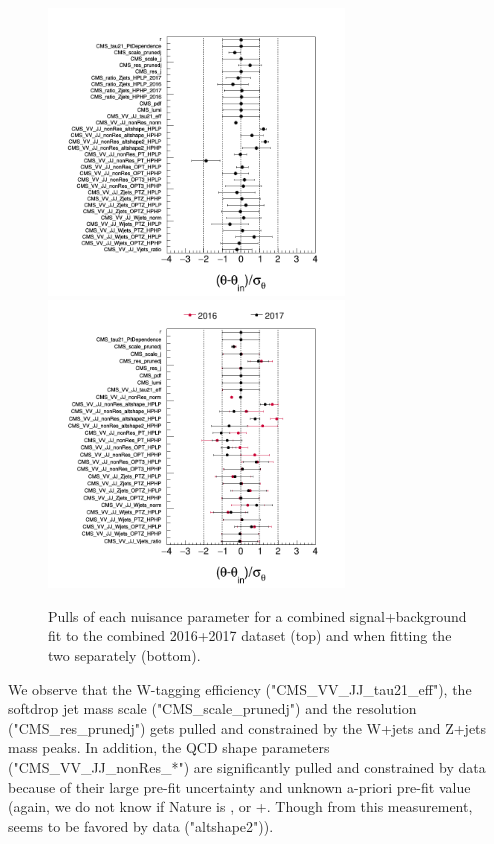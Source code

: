 \begin{figure}[h!]
\centering
\includegraphics[width=0.7\textwidth]{figures/analysis/search3/AN-17-303/postfitchecks/pulls_Combo1617.png}\\
\includegraphics[width=0.7\textwidth]{figures/analysis/search3/AN-17-303/postfitchecks/pulls_16_vs_17.png}
\caption{Pulls of each nuisance parameter for a combined signal+background fit to the combined 2016+2017 dataset (top) and when fitting the two separately (bottom).}
\label{fig:searchIII:pullsCombo1617}
\end{figure}
We observe that the W-tagging efficiency ("CMS\_VV\_JJ\_tau21\_eff"), the softdrop jet mass scale ("CMS\_scale\_prunedj") and the resolution ("CMS\_res\_prunedj") gets pulled and constrained by the W+jets and Z+jets mass peaks. In addition, the QCD shape parameters ("CMS\_VV\_JJ\_nonRes\_*") are significantly pulled and constrained by data because of their large pre-fit uncertainty and unknown a-priori pre-fit value (again, we do not know if Nature is , \HERWIG{++} or \MADGRAPH{}+. Though from this measurement, \HERWIG{++} seems to be favored by data ("altshape2")).

